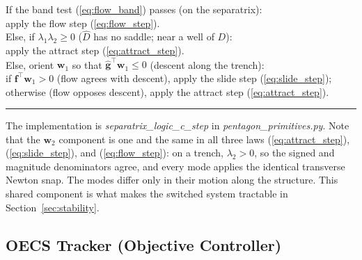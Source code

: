 \documentclass[lettersize,journal]{IEEEtran}
\begin{document}
\vspace{3pt}
\noindent If the band test (\ref{eq:flow_band}) passes (on the
separatrix):\\
\hspace*{1.5em} apply the flow step (\ref{eq:flow_step}).\\
Else, if $\lambda_1 \lambda_2 \geq 0$ ($\hat{D}$ has no saddle; near a
well of $D$):\\
\hspace*{1.5em} apply the attract step (\ref{eq:attract_step}).\\
Else, orient $\mathbf{w}_1$ so that $\hat{\mathbf{g}}^\top \mathbf{w}_1
\leq 0$ (descent along the trench):\\
\hspace*{1.5em} if $\mathbf{f}^\top \mathbf{w}_1 > 0$ (flow agrees with
descent), apply the slide step (\ref{eq:slide_step});\\
\hspace*{1.5em} otherwise (flow opposes descent), apply the attract
step (\ref{eq:attract_step}).
\vspace{4pt}
\hrule
\vspace{4pt}

The implementation is \textit{separatrix\_logic\_c\_step} in
\textit{pentagon\_primitives.py}. Note that the $\mathbf{w}_2$
component is one and the same in all three laws
(\ref{eq:attract_step}), (\ref{eq:slide_step}), and
(\ref{eq:flow_step}): on a trench, $\lambda_2 > 0$, so the signed and
magnitude denominators agree, and every mode applies the identical
transverse Newton snap. The modes differ only in their motion along the
structure. This shared component is what makes the switched system
tractable in Section~\ref{sec:stability}.

\subsection{OECS Tracker (Objective Controller)}
\label{sec:oecs_controller}
\end{document}
